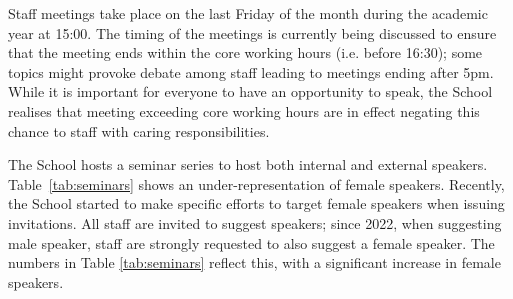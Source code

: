 Staff meetings take place on the last Friday of the month during the academic year at 15:00. The timing of the meetings is currently being discussed to ensure that the meeting ends within the core working hours (i.e. before 16:30); some topics might provoke debate among staff leading to meetings ending after 5pm. While it is important for everyone to have an opportunity to speak, the School realises that meeting exceeding core working hours are in effect negating this chance to staff with caring responsibilities.

The School hosts a seminar series to host both internal and external speakers. Table~\ref{tab:seminars} shows an under-representation of female speakers. Recently, the School started to make specific efforts to target female  speakers when issuing invitations.
All staff are invited to suggest speakers; since 2022, when suggesting male speaker, staff are strongly requested to also suggest a female speaker. The numbers in Table \ref{tab:seminars} reflect this, with a significant increase in female speakers.



